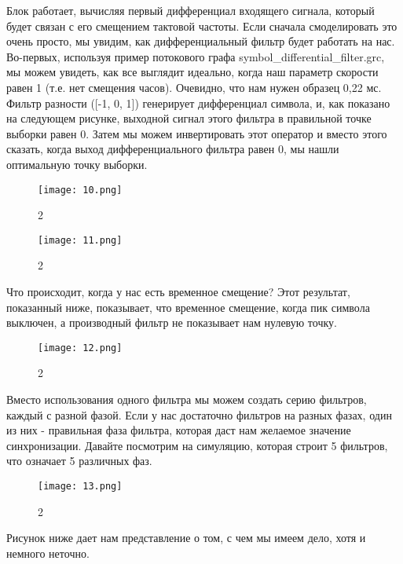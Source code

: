 \documentclass[10pt,a4paper,oneside]{article}
\begin{document}
Блок работает, вычисляя первый дифференциал входящего сигнала, который будет связан с его смещением тактовой частоты. Если сначала смоделировать это очень просто, мы увидим, как дифференциальный фильтр будет работать на нас. Во-первых, используя пример потокового графа symbol_differential_filter.grc, мы можем увидеть, как все выглядит идеально, когда наш параметр скорости равен 1 (т.е. нет смещения часов). Очевидно, что нам нужен образец 0,22 мс. Фильтр разности ([-1, 0, 1]) генерирует дифференциал символа, и, как показано на следующем рисунке, выходной сигнал этого фильтра в правильной точке выборки равен 0. Затем мы можем инвертировать этот оператор и вместо этого сказать, когда выход дифференциального фильтра равен 0, мы нашли оптимальную точку выборки.

\begin{figure}[H]
        \centering
        \texttt{[image: 10.png]}
        \caption{2}
        \label{fig:first}
\end{figure}

\begin{figure}[H]
        \centering
        \texttt{[image: 11.png]}
        \caption{2}
        \label{fig:first}
\end{figure}

Что происходит, когда у нас есть временное смещение? Этот результат, показанный ниже, показывает, что временное смещение, когда пик символа выключен, а производный фильтр не показывает нам нулевую точку.

\begin{figure}[H]
        \centering
        \texttt{[image: 12.png]}
        \caption{2}
        \label{fig:first}
\end{figure}

Вместо использования одного фильтра мы можем создать серию фильтров, каждый с разной фазой. Если у нас достаточно фильтров на разных фазах, один из них - правильная фаза фильтра, которая даст нам желаемое значение синхронизации. Давайте посмотрим на симуляцию, которая строит 5 фильтров, что означает 5 различных фаз.

\begin{figure}[H]
        \centering
        \texttt{[image: 13.png]}
        \caption{2}
        \label{fig:first}
\end{figure}

Рисунок ниже дает нам представление о том, с чем мы имеем дело, хотя и немного неточно.
\end{document}
